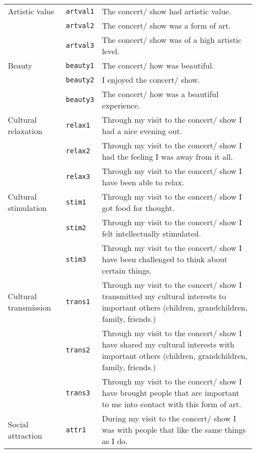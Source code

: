 \begin{longtable}{llp{11cm}}
    Artistic value          & \texttt{artval1}   & The concert/ show had artistic value. \\
                            & \texttt{artval2}   & The concert/ show was a form of art. \\
                            & \texttt{artval3}   & The concert/ show was of a high artistic level. \\
    \hline
    Beauty                  & \texttt{beauty1}   & The concert/ how was beautiful. \\
                            & \texttt{beauty2}   & I enjoyed the concert/ show. \\
                            & \texttt{beauty3}   & The concert/ how was a beautiful experience. \\
    \hline
    Cultural relaxation     & \texttt{relax1}    & Through my visit to the concert/ show I had a nice evening out. \\
                            & \texttt{relax2}    & Through my visit to the concert/ show I had the feeling I was away from it all. \\
                            & \texttt{relax3}    & Through my visit to the concert/ show I have been able to relax. \\
    \hline
    Cultural stimulation    & \texttt{stim1}     & Through my visit to the concert/ show I got food for thought. \\
                            & \texttt{stim2}     & Through my visit to the concert/ show I felt intellectually stimulated. \\
                            & \texttt{stim3}     & Through my visit to the concert/ show I have been challenged to think about certain things. \\
    \hline
    Cultural transmission   & \texttt{trans1}    & Through my visit to the concert/ show I transmitted my cultural interests to important others (children, grandchildren, family, friends.) \\
                            & \texttt{trans2}    & Through my visit to the concert/ show I have shared my cultural interests with important others (children, grandchildren, family, friends.) \\
                            & \texttt{trans3}    & Through my visit to the concert/ show I have brought people that are important to me into contact with this form of art. \\
    \hline
    Social attraction       & \texttt{attr1}     & During my visit to the concert/ show I was with people that like the same things as I do. \\

\end{longtable}
